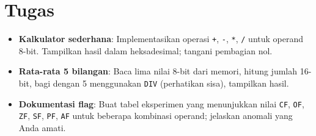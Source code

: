 \section{Tugas}
\begin{itemize}
  \item \textbf{Kalkulator sederhana}: Implementasikan operasi \texttt{+}, \texttt{-}, \texttt{*}, \texttt{/} untuk operand 8-bit. Tampilkan hasil dalam heksadesimal; tangani pembagian nol.
  \item \textbf{Rata-rata 5 bilangan}: Baca lima nilai 8-bit dari memori, hitung jumlah 16-bit, bagi dengan 5 menggunakan \texttt{DIV} (perhatikan sisa), tampilkan hasil.
  \item \textbf{Dokumentasi flag}: Buat tabel eksperimen yang menunjukkan nilai \texttt{CF}, \texttt{OF}, \texttt{ZF}, \texttt{SF}, \texttt{PF}, \texttt{AF} untuk beberapa kombinasi operand; jelaskan anomali yang Anda amati.
\end{itemize}

